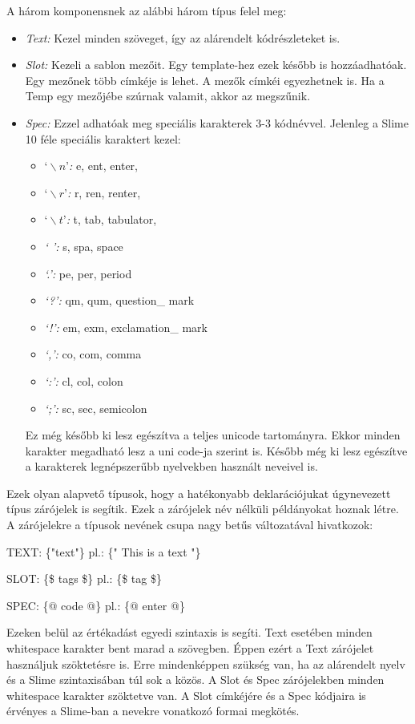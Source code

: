 A három komponensnek az alábbi három típus felel meg:
\begin{itemize}
\item \emph{Text:} 
Kezel minden szöveget, így az alárendelt kódrészleteket is.
\item \emph{Slot:} 
Kezeli a sablon mezőit.
Egy template-hez ezek később is hozzáadhatóak.
Egy mezőnek több címkéje is lehet.
A mezők címkéi egyezhetnek is.
Ha a Temp egy mezőjébe szúrnak valamit, akkor az megszűnik. \todo{}
\item \emph{Spec:} 
Ezzel adhatóak meg speciális karakterek 3-3 kódnévvel.
Jelenleg a Slime 10 féle speciális karaktert kezel:
\begin{itemize}
\item \emph{$‘\backslash n’$:} e, ent, enter, 
\item \emph{$‘\backslash r’$:} r, ren, renter, 
\item \emph{$‘\backslash t’$:} t, tab, tabulator, 
\item \emph{‘ ’:} s, spa, space 
\item \emph{‘.’:} pe, per, period 
\item \emph{‘?’:} qm, qum, question\_ mark 
\item \emph{‘!’:} em, exm, exclamation\_ mark 
\item \emph{‘,’:} co, com, comma
\item \emph{‘:’:} cl, col, colon 
\item \emph{‘;’:} sc, sec, semicolon
\end{itemize}
Ez még később ki lesz egészítva a teljes unicode tartományra. Ekkor minden karakter megadható lesz a uni code-ja szerint is.
Később még ki lesz egészítve a karakterek legnépszerűbb nyelvekben használt neveivel is.
\end{itemize}

Ezek olyan alapvető típusok, hogy a hatékonyabb deklarációjukat úgynevezett típus zárójelek is segítik. 
Ezek a zárójelek név nélküli példányokat hoznak létre.
A zárójelekre a típusok nevének csupa nagy betűs változatával hivatkozok:

TEXT: \{"text"\} pl.: \{" This is a text "\}

SLOT: \{\$ tags \$\} pl.: \{\$ tag \$\}

SPEC: \{@ code @\} pl.: \{@ enter @\}

Ezeken belül az értékadást egyedi szintaxis is segíti.
Text esetében minden whitespace karakter bent marad a szövegben.
Éppen ezért a Text zárójelet használjuk szöktetésre is.
Erre mindenképpen szükség van, ha az alárendelt nyelv és a Slime szintaxisában túl sok a közös.
A Slot és Spec zárójelekben minden whitespace karakter szöktetve van. 
A Slot címkéjére és a Spec kódjaira is érvényes a Slime-ban a nevekre vonatkozó formai megkötés. 

